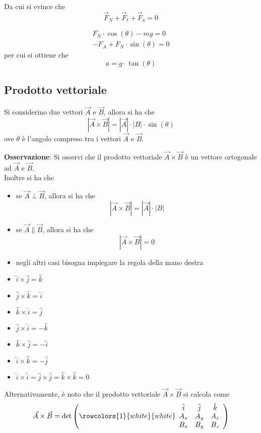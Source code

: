 \documentclass[a4paper]{extarticle}
\begin{document}
\vspace{1em}
\noindent
Da cui si evince che
\[\vec{F}_N + \vec{F}_t + \vec{F}_a = 0\]

\begin{align*}
  F_N \cdot \cos(\theta) - mg = 0\\
  -F_A + F_N \cdot \sin(\theta) = 0
\end{align*}
per cui si ottiene che
\[a = g \cdot \tan(\theta)\]

\vspace{1em}
\subsection{Prodotto vettoriale}
Si considerino due vettori $\vec{A}$ e $\vec{B}$, allora si ha che
\[\left \vert \vec{A} \times \vec{B} \right \vert = \left \vert \vec{A} \right \vert \cdot \left \vert B \right \vert \cdot \sin(\theta)\]
ove $\theta$ è l'angolo compreso tra i vettori $\vec{A}$ e $\vec{B}$.

\vspace{1em}
\noindent
\textbf{Osservazione}: Si osservi che il prodotto vettoriale $\vec{A} \times \vec{B}$ è un vettore ortogonale ad $\vec{A}$ e $\vec{B}$.\\
Inoltre si ha che
\begin{itemize}
  \item se $\vec{A} \perp \vec{B}$, allora si ha che
  \[\left \vert \vec{A} \times \vec{B} \right \vert = \left \vert \vec{A} \right \vert \cdot \left \vert B \right \vert\]

  \item se $\vec{A} \parallel \vec{B}$, allora si ha che
  \[\left \vert \vec{A} \times \vec{B} \right \vert = 0\]

  \item negli altri casi bisogna impiegare la regola della mano destra

  \item $\hat{i} \times \hat{j} = \hat{k}$
  \item $\hat{j} \times \hat{k} = \hat{i}$
  \item $\hat{k} \times \hat{i} = \hat{j}$
  \item $\hat{j} \times \hat{i} = -\hat{k}$
  \item $\hat{k} \times \hat{j} = -\hat{i}$
  \item $\hat{i} \times \hat{k} = -\hat{j}$
  \item $\hat{i} \times \hat{i} = \hat{j} \times \hat{j} = \hat{k} \times \hat{k} = 0$
\end{itemize}
Alternativamente, è noto che il prodotto vettoriale $\vec{A} \times \vec{B}$ si calcola come
\[\vec{A} \times \vec{B} = \det \left(
  \rowcolors{1}{white}{white}
  \begin{array}{ccc}
    \hat{i} & \hat{j} & \hat{k}\\
    A_x & A_y & A_z\\
    B_x & B_y & B_z
  \end{array}
\right)\]
\end{document}
